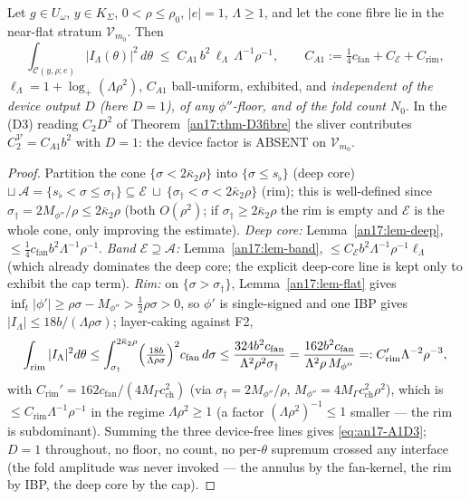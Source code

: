 \begin{theorem}[A1; the near-flat sliver closes (D3) at the binding cut, $D=1$]
\label{an17:thm-A1}%
\label{an17:A1-main}%
\label{thm:A1-main}%
Let $g\in U_\omega$, $y\in K_\Sigma$, $0<\rho\le\rho_0$, $|e|=1$, $\Lambda\ge1$,
and let the cone fibre lie in the near-flat stratum $\mathcal V_{m_0}$. Then
\begin{equation}\label{eq:an17-A1D3}
 \int_{\mathcal C(y,\rho;e)}|I_\Lambda(\theta)|^2\,d\theta\;\le\;
 C_{A1}\,b^2\,\ell_\Lambda\,\Lambda^{-1}\rho^{-1},\qquad
 C_{A1}:=\tfrac14 c_{\mathrm{fan}}+C_{\mathcal E}+C_{\mathrm{rim}},
\end{equation}
$\ell_\Lambda=1+\log_+(\Lambda\rho^2)$, $C_{A1}$ ball-uniform, exhibited, and
\emph{independent of the device output $D$ (here $D=1$), of any $\phi''$-floor, and
of the fold count $N_0$}. In the (D3) reading $C_2 D^2$ of
Theorem~\ref{an17:thm-D3fibre} the sliver contributes $C_2^{\mathcal V}=C_{A1}b^2$
with $D=1$: the device factor is ABSENT on $\mathcal V_{m_0}$.
\end{theorem}
\begin{proof}
Partition the cone $\{\sigma<2\bar\kappa_2\rho\}$ into
$\{\sigma\le s_\flat\}$ (deep core) $\sqcup\ \mathcal A=\{s_\flat<\sigma\le
\sigma_\dagger\}\subseteq\mathcal E\ \sqcup\ \{\sigma_\dagger<\sigma<2\bar\kappa_2
\rho\}$ (rim); this is well-defined since $\sigma_\dagger=2M_{\phi''}/\rho\le
2\bar\kappa_2\rho$ (both $O(\rho^2)$; if $\sigma_\dagger\ge2\bar\kappa_2\rho$ the
rim is empty and $\mathcal E$ is the whole cone, only improving the estimate).
\emph{Deep core:} Lemma~\ref{an17:lem-deep}, $\le\tfrac14 c_{\mathrm{fan}}b^2
\Lambda^{-1}\rho^{-1}$. \emph{Band $\mathcal E\supseteq\mathcal A$:}
Lemma~\ref{an17:lem-band}, $\le C_{\mathcal E}b^2\Lambda^{-1}\rho^{-1}\ell_\Lambda$
(which already dominates the deep core; the explicit deep-core line is kept only to
exhibit the cap term). \emph{Rim:} on $\{\sigma>\sigma_\dagger\}$,
Lemma~\ref{an17:lem-flat} gives $\inf_t|\phi'|\ge\rho\sigma-M_{\phi''}>\tfrac12
\rho\sigma>0$, so $\phi'$ is single-signed and one IBP gives $|I_\Lambda|\le18b/(\Lambda
\rho\sigma)$; layer-caking against F2,
\[
 \int_{\mathrm{rim}}|I_\Lambda|^2 d\theta\le\int_{\sigma_\dagger}^{2\bar\kappa_2
 \rho}\Bigl(\tfrac{18b}{\Lambda\rho\sigma}\Bigr)^2 c_{\mathrm{fan}}\,d\sigma
 \le\frac{324 b^2 c_{\mathrm{fan}}}{\Lambda^2\rho^2\sigma_\dagger}
 =\frac{162 b^2 c_{\mathrm{fan}}}{\Lambda^2\rho\,M_{\phi''}}
 =:C_{\mathrm{rim}}'\Lambda^{-2}\rho^{-3},
\]
with $C_{\mathrm{rim}}'=162 c_{\mathrm{fan}}/(4M_\Gamma c_{\mathrm{ch}}^2)$ (via
$\sigma_\dagger=2M_{\phi''}/\rho$, $M_{\phi''}=4M_\Gamma c_{\mathrm{ch}}^2\rho^2$),
which is $\le C_{\mathrm{rim}}\Lambda^{-1}\rho^{-1}$ in the regime $\Lambda\rho^2
\ge1$ (a factor $(\Lambda\rho^2)^{-1}\le1$ smaller --- the rim is subdominant).
Summing the three device-free lines gives \eqref{eq:an17-A1D3}; $D=1$ throughout,
no floor, no count, no per-$\theta$ supremum crossed any interface (the fold
amplitude was never invoked --- the annulus by the fan-kernel, the rim by IBP, the
deep core by the cap).
\end{proof}

